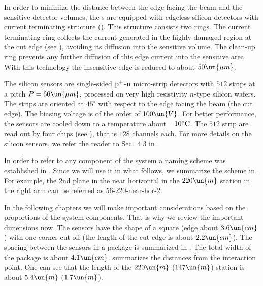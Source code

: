 In order to minimize the distance between the  edge facing the beam and the sensitive detector volumes, the s are equipped with edgeless silicon detectors with current terminating structure (). This structure consists two rings. The current terminating ring collects the current generated in the highly damaged region at the cut edge (see ), avoiding its diffusion into the sensitive volume. The clean-up ring prevents any further diffusion of this edge current into the sensitive area. With this technology the insensitive edge is reduced to about $50\un{\mu m}$.

The silicon sensors are single-sided $\rm p^+$-$\rm n$ micro-strip detectors with $512$ strips at a pitch $P = 66\un{\mu m}$, processed on very high resistivity
$n$-type silicon wafers. The strips are oriented at $45^\circ$ with respect to the edge facing the beam (the cut edge). The biasing voltage is of the order of $100\un{V}$. For better performance, the sensors are cooled down to a temperature about $-10^\circ\rm C$. The $512$ strip are read out by four  chips (see ), that is $128$ channels each. For more details on the silicon sensors, we refer the reader to Sec.~4.3 in .

In order to refer to any component of the  system a naming scheme was established in . Since we will use it in what follows, we summarize the scheme in . For example, the 2nd plane in the near horizontal  in the $220\un{m}$ station in the right arm can be referred as 56-220-near-hor-2.


In the following chapters we will make important considerations based on the proportions of the  system components. That is why we review the important dimensions now. The sensors have the shape of a square (edge about $3.6\un{cm}$) with one corner cut off (the length of the cut edge is about $2.2\un{cm}$). The spacing between the sensors in a package is summarized in . The total width of the package is about $4.1\un{cm}$.  summarizes the  distances from the interaction point. One can see that the length of the $220\un{m}$ ($147\un{m}$) station is about $5.4\un{m}$ ($1.7\un{m}$).

